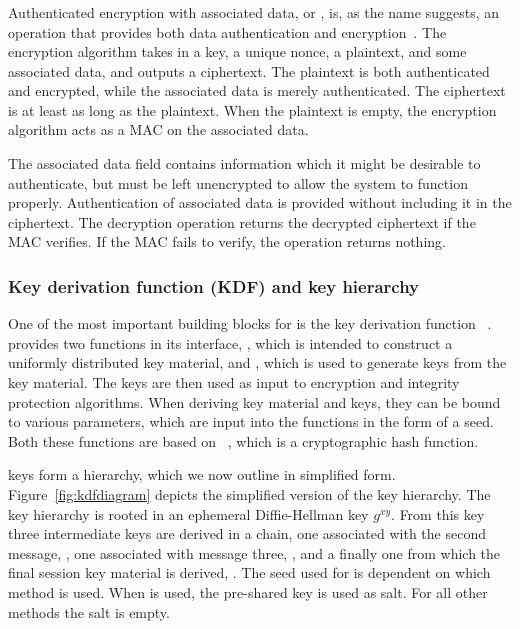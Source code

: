 {\subsubsection{\mAead{}}
Authenticated encryption with associated data, or \mAead{}, {is, as the name suggests, an operation that provides
both data authentication and encryption}~\cite{aead}. The {encryption} algorithm takes in a
key, a unique nonce, a plaintext, and some associated data, and outputs a
ciphertext. The plaintext is both authenticated and encrypted, while the
associated data is merely authenticated. The ciphertext is at least as long as
the plaintext. When the plaintext is empty, the \mAead{} encryption
algorithm acts as a MAC on the associated data.

The associated data {field contains} information {which it might be desirable to authenticate, but} must be left unencrypted to allow the system to function properly.
Authentication {of associated data} is provided without {including it in the ciphertext.} {The \mAead{} decryption operation returns the decrypted ciphertext if   the MAC verifies. If the MAC fails to verify, the operation returns
nothing.}

\subsubsection{Key derivation function (KDF) and key hierarchy}
One of the most important building blocks for \mEdhoc{} is the key derivation
function \mHkdf{}~\cite{rfc5869}.
\mHkdf{} provides two functions in its interface, \mHkdfExtract{}, which is
intended to construct a uniformly distributed key material, and \mHkdfExpand{},
which is used to generate keys from the key material.
The keys are then used as input to encryption and integrity protection
algorithms. When deriving key material and keys, they can be bound to various
parameters, which are input into the functions in the form of a seed.
Both these functions are based on \mHmac~\cite{rfc2104},
which is a cryptographic hash function.

\mEdhoc{} keys form a hierarchy, which we now outline in simplified form.
Figure~\ref{fig:kdfdiagram} depicts the simplified version of the key hierarchy.
The key hierarchy is rooted in an ephemeral Diffie-Hellman key $g^{xy}$.
From this key three intermediate keys are derived in a chain, one associated
with the second message,
\mPRKtwo{}, one associated with message three, \mPRKthree{}, and a finally one from
which the final session key material is derived, \mPRKfour{}.
The seed used for \mPRKtwo{} is dependent on which method is used. When
\mPskPsk{} is used, the pre-shared key is used as salt. For all other methods
the salt is empty.

}
